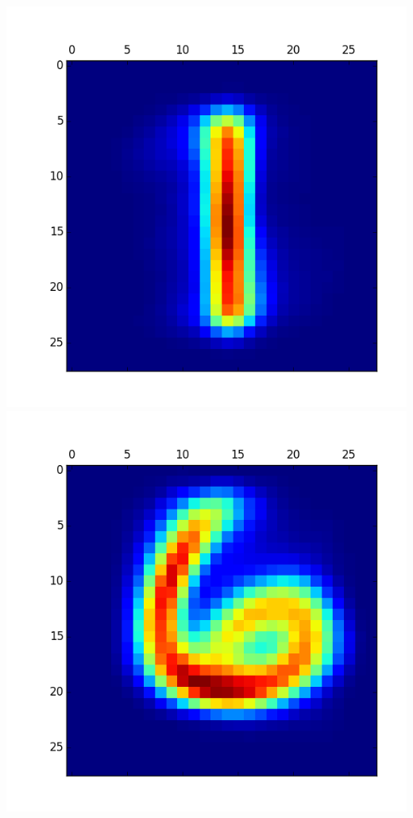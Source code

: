 \documentclass[11pt]{article}
\begin{document}
\begin{itemize}
\includegraphics[scale = 0.5]{16.png}
\includegraphics[scale = 0.5]{17.png}


\end{itemize}
\end{document}
